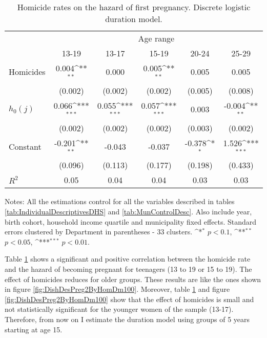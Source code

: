 \documentclass[a4paper,10pt,twocolumn,preprint,3p,authoryear]{elsarticle}
\def\sym#1{\ifmmode^{#1}\else\(^{#1}\)\fi}
\begin{document}
\begin{table}[h]
	\caption{\\ Homicide rates on the hazard of first pregnancy. Discrete logistic  duration model.}	
	\footnotesize
	\begin{tabular}{lccccc}
		\hline
		& \multicolumn{5}{c}{{Age range}} \\  
					&	13-19&	 13-17&	15-19& 20-24& 25-29 \\ \hline
		Homicides	&       0.004\sym{**} &	       0.000         &	       0.005\sym{**} &	       0.005         &	       0.005         \\
	&     (0.002)         &	     (0.002)         &	     (0.002)         &	     (0.005)         &	     (0.008)         \\
					
	$h_{0}(j)$	&       0.066\sym{***}&	       0.055\sym{***}&	       0.057\sym{***}&	       0.003         &	      -0.004\sym{**} \\
	&     (0.002)         &	     (0.002)         &	     (0.002)         &	     (0.003)         &	     (0.002)         \\
					
Constant	&      -0.201\sym{**} &	      -0.043         &	      -0.037         &	      -0.378\sym{*}  &	       1.526\sym{***}\\
	&     (0.096)         &	     (0.113)         &	     (0.177)         &	     (0.198)         &	     (0.433)         \\
\hline					
$R^{2}$	&        0.05         &	        0.04         &	        0.04         &	        0.03         &	        0.03         \\	 \hline
	\end{tabular}
	\begin{minipage}[t]{1\columnwidth}%
		  \begin{spacing}{1}
		  \noindent 
		  {Notes: All the estimations control for all the variables described in tables \ref{tab:IndividualDescriptivesDHS} and \ref{tab:MunControlDesc}. Also include year, birth cohort, household income quartile and municipality fixed effects. Standard errors clustered by Department in parentheses - 33 clusters. \sym{*} $p<0.1$, \sym{**} $p<0.05$, \sym{***} $p<0.01$.
		  }
		  \end{spacing}
	  \end{minipage}

	\label{tab:OLSDuration_homRate}
\end{table}

Table \ref{tab:OLSDuration_homRate} shows a significant and positive correlation between the homicide rate and the hazard of becoming pregnant for teenagers (13 to 19 or 15 to 19). The effect of homicides reduces for older groups. These results are like the ones shown in figure \ref{fig:DishDesPreg2ByHomDm100}. Moreover, table \ref{tab:OLSDuration_homRate} and figure \ref{fig:DishDesPreg2ByHomDm100} show that the effect of homicides is small and not statistically significant for the younger women of the sample (13-17). Therefore, from now on I estimate the duration model using groups of 5 years starting at age 15.
\end{document}
